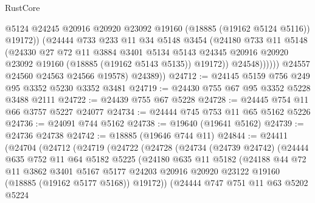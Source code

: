 \begin{lexlean}{RustCore}
\begin{coremodule}
                        @5124
                        @24245
                        @20916
                        @20920
                        @23092
                        @19160
                        (@18885 (@19162 @5124 @5116))
                        @19172))
                    (@24444
                      @733
                      @233
                      @11
                      @34
                      @5148
                      @3454
                      (@24180
                        @733
                        @11
                        @5148
                        (@24330
                          @27
                          @72
                          @11
                          @3884
                          @3401
                          @5134
                          @5143
                          @24345
                          @20916
                          @20920
                          @23092
                          @19160
                          (@18885 (@19162 @5143 @5135))
                          @19172))
                      @24548))))))
          @24557
          @24560
          @24563
          @24566
          @19578)
        @24389))
@24712 := @24145 @5159 @756 @249 @95 @3352 @5230 @3352 @3481
@24719 := @24430 @755 @67 @95 @3352 @5228 @3488 @2111
@24722 := @24439 @755 @67 @5228
@24728 := @24445 @754 @11 @66 @3757 @5227 @24077
@24734 := @24444 @745 @753 @11 @65 @5162 @5226
@24736 := @24091 @744 @5162
@24738 := @19640 (@19641 @5162)
@24739 := @24736 @24738
@24742 := @18885 (@19646 @744 @11)
@24844 := @24411
    (@24704
      (@24712
        (@24719
          (@24722
            (@24728
              (@24734
                (@24739 @24742)
                (@24444
                  @635
                  @752
                  @11
                  @64
                  @5182
                  @5225
                  (@24180
                    @635
                    @11
                    @5182
                    (@24188
                      @44
                      @72
                      @11
                      @3862
                      @3401
                      @5167
                      @5177
                      @24203
                      @20916
                      @20920
                      @23122
                      @19160
                      (@18885 (@19162 @5177 @5168))
                      @19172))
                  (@24444
                    @747
                    @751
                    @11
                    @63
                    @5202
                    @5224

\end{coremodule}
\end{lexlean}
